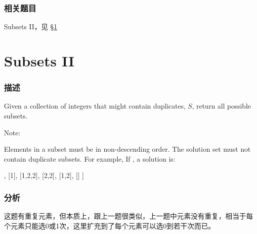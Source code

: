 \subsubsection{相关题目}
\begindot
\item Subsets II，见 \S \ref{sec:subsets-ii}
\myenddot


\section{Subsets II} %
\label{sec:subsets-ii}


\subsubsection{描述}
Given a collection of integers that might contain duplicates, $S$, return all possible subsets.

Note:

Elements in a subset must be in non-descending order.
The solution set must not contain duplicate subsets.
For example,
If , a solution is:
\begin{Code}
[
  [2],
  [1],
  [1,2,2],
  [2,2],
  [1,2],
  []
]
\end{Code}


\subsubsection{分析}
这题有重复元素，但本质上，跟上一题很类似，上一题中元素没有重复，相当于每个元素只能选0或1次，这里扩充到了每个元素可以选0到若干次而已。


